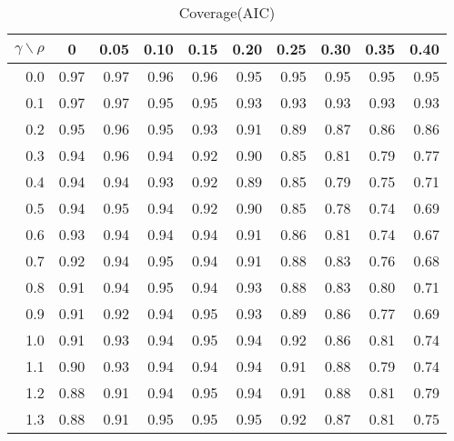 \documentclass[12pt]{article}
\begin{document}
%
\begin{table}[!tbp]
\caption{Coverage(AIC)}
 \begin{center}
 \begin{tabular}{r|rrrrrrrrr}\hline\hline
\multicolumn{1}{c|}{$\gamma\backslash\rho$}&\multicolumn{1}{c}{0}&\multicolumn{1}{c}{0.05}&\multicolumn{1}{c}{0.10}&\multicolumn{1}{c}{0.15}&\multicolumn{1}{c}{0.20}&\multicolumn{1}{c}{0.25}&\multicolumn{1}{c}{0.30}&\multicolumn{1}{c}{0.35}&\multicolumn{1}{c}{0.40}\tabularnewline
\hline

0.0&0.97&0.97&0.96&0.96&0.95&0.95&0.95&0.95&0.95\tabularnewline
0.1&0.97&0.97&0.95&0.95&0.93&0.93&0.93&0.93&0.93\tabularnewline
0.2&0.95&0.96&0.95&0.93&0.91&0.89&0.87&0.86&0.86\tabularnewline
0.3&0.94&0.96&0.94&0.92&0.90&0.85&0.81&0.79&0.77\tabularnewline
0.4&0.94&0.94&0.93&0.92&0.89&0.85&0.79&0.75&0.71\tabularnewline
0.5&0.94&0.95&0.94&0.92&0.90&0.85&0.78&0.74&0.69\tabularnewline
0.6&0.93&0.94&0.94&0.94&0.91&0.86&0.81&0.74&0.67\tabularnewline
0.7&0.92&0.94&0.95&0.94&0.91&0.88&0.83&0.76&0.68\tabularnewline
0.8&0.91&0.94&0.95&0.94&0.93&0.88&0.83&0.80&0.71\tabularnewline
0.9&0.91&0.92&0.94&0.95&0.93&0.89&0.86&0.77&0.69\tabularnewline
1.0&0.91&0.93&0.94&0.95&0.94&0.92&0.86&0.81&0.74\tabularnewline
1.1&0.90&0.93&0.94&0.94&0.94&0.91&0.88&0.79&0.74\tabularnewline
1.2&0.88&0.91&0.94&0.95&0.94&0.91&0.88&0.81&0.79\tabularnewline
1.3&0.88&0.91&0.95&0.95&0.95&0.92&0.87&0.81&0.75\tabularnewline
\hline
\end{tabular}

\end{center}

\end{table}
\end{document}
